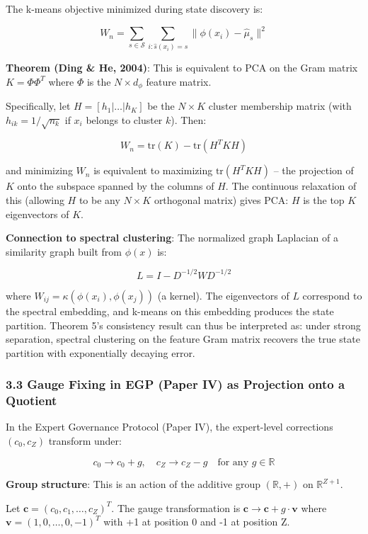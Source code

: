 \documentclass[
  12pt,
]{ctexart}
\begin{document}
The k-means objective minimized during state discovery is:

\[W_n = \sum_{s \in \mathcal{S}} \sum_{i: \hat{s}(x_i) = s} \|\phi(x_i) - \hat{\mu}_s\|^2\]

\textbf{Theorem (Ding \& He, 2004)}: This is equivalent to PCA on the
Gram matrix \(K = \Phi\Phi^T\) where \(\Phi\) is the \(N \times d_\phi\)
feature matrix.

Specifically, let \(H = [h_1 | \dots | h_K]\) be the \(N \times K\)
cluster membership matrix (with \(h_{ik} = 1/\sqrt{n_k}\) if \(x_i\)
belongs to cluster \(k\)). Then:

\[W_n = \text{tr}(K) - \text{tr}(H^T K H)\]

and minimizing \(W_n\) is equivalent to maximizing
\(\text{tr}(H^T K H)\) -- the projection of \(K\) onto the subspace
spanned by the columns of \(H\). The continuous relaxation of this
(allowing \(H\) to be any \(N \times K\) orthogonal matrix) gives PCA:
\(H\) is the top \(K\) eigenvectors of \(K\).

\textbf{Connection to spectral clustering}: The normalized graph
Laplacian of a similarity graph built from \(\phi(x)\) is:

\[L = I - D^{-1/2} W D^{-1/2}\]

where \(W_{ij} = \kappa(\phi(x_i), \phi(x_j))\) (a kernel). The
eigenvectors of \(L\) correspond to the spectral embedding, and k-means
on this embedding produces the state partition. Theorem 5's consistency
result can thus be interpreted as: under strong separation, spectral
clustering on the feature Gram matrix recovers the true state partition
with exponentially decaying error.

\subsubsection{3.3 Gauge Fixing in EGP (Paper IV) as Projection onto a
Quotient}\label{gauge-fixing-in-egp-paper-iv-as-projection-onto-a-quotient}

In the Expert Governance Protocol (Paper IV), the expert-level
corrections \((c_0, c_Z)\) transform under:

\[c_0 \to c_0 + g, \quad c_Z \to c_Z - g \quad \text{for any } g \in \mathbb{R}\]

\textbf{Group structure}: This is an action of the additive group
\((\mathbb{R}, +)\) on \(\mathbb{R}^{Z+1}\).

Let \(\mathbf{c} = (c_0, c_1, \dots, c_Z)^T\). The gauge transformation
is \(\mathbf{c} \to \mathbf{c} + g \cdot \mathbf{v}\) where
\(\mathbf{v} = (1, 0, \dots, 0, -1)^T\) with +1 at position 0 and -1 at
position Z.
\end{document}
